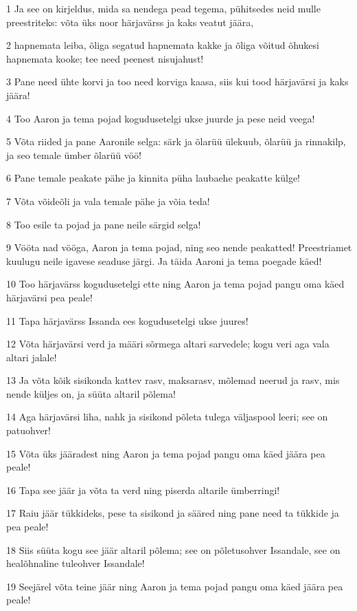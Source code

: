 \par 1 Ja see on kirjeldus, mida sa nendega pead tegema, pühitsedes neid mulle preestriteks: võta üks noor härjavärss ja kaks veatut jäära,
\par 2 hapnemata leiba, õliga segatud hapnemata kakke ja õliga võitud õhukesi hapnemata kooke; tee need peenest nisujahust!
\par 3 Pane need ühte korvi ja too need korviga kaasa, siis kui tood härjavärsi ja kaks jäära!
\par 4 Too Aaron ja tema pojad kogudusetelgi ukse juurde ja pese neid veega!
\par 5 Võta riided ja pane Aaronile selga: särk ja õlarüü ülekuub, õlarüü ja rinnakilp, ja seo temale ümber õlarüü vöö!
\par 6 Pane temale peakate pähe ja kinnita püha laubaehe peakatte külge!
\par 7 Võta võideõli ja vala temale pähe ja võia teda!
\par 8 Too esile ta pojad ja pane neile särgid selga!
\par 9 Vööta nad vööga, Aaron ja tema pojad, ning seo nende peakatted! Preestriamet kuulugu neile igavese seaduse järgi. Ja täida Aaroni ja tema poegade käed!
\par 10 Too härjavärss kogudusetelgi ette ning Aaron ja tema pojad pangu oma käed härjavärsi pea peale!
\par 11 Tapa härjavärss Issanda ees kogudusetelgi ukse juures!
\par 12 Võta härjavärsi verd ja määri sõrmega altari sarvedele; kogu veri aga vala altari jalale!
\par 13 Ja võta kõik sisikonda kattev rasv, maksarasv, mõlemad neerud ja rasv, mis nende küljes on, ja süüta altaril põlema!
\par 14 Aga härjavärsi liha, nahk ja sisikond põleta tulega väljaspool leeri; see on patuohver!
\par 15 Võta üks jääradest ning Aaron ja tema pojad pangu oma käed jäära pea peale!
\par 16 Tapa see jäär ja võta ta verd ning piserda altarile ümberringi!
\par 17 Raiu jäär tükkideks, pese ta sisikond ja sääred ning pane need ta tükkide ja pea peale!
\par 18 Siis süüta kogu see jäär altaril põlema; see on põletusohver Issandale, see on healõhnaline tuleohver Issandale!
\par 19 Seejärel võta teine jäär ning Aaron ja tema pojad pangu oma käed jäära pea peale!
